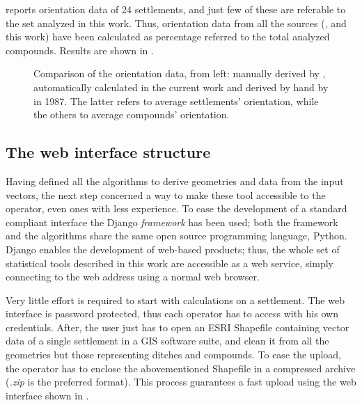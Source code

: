             \cite{jones-tavoliere} reports orientation data of 24 settlements, and just few of these are referable to the set analyzed in this work. Thus, orientation data from all the sources (\cite{laterza}, \cite{jones-tavoliere} and this work) have been calculated as percentage referred to the total analyzed compounds. Results are shown in .

            \begin{figure}[H]
                \centering
                \begin{tikzpicture}
                    
                \end{tikzpicture}
                \caption[Comparison of automatically derived orientation data with the other sources.]{Comparison of the orientation data, from left: manually derived by \citeauthor{laterza}, automatically calculated in the current work and derived by hand by \citeauthor{jones-tavoliere} in 1987. The latter refers to average settlements' orientation, while the others to average compounds' orientation.}
                \label{fig:graph-orient-jones}
            \end{figure}

        \subsection{The web interface structure\label{sec:webgis}}
            Having defined all the algorithms to derive geometries and data from the input vectors, the next step concerned a way to make these tool accessible to the operator, even ones with less experience. To ease the development of a standard compliant interface the Django \emph{framework} has been used; both the framework and the algorithms share the same open source programming language, Python.
            Django enables the development of web-based products; thus, the whole set of statistical tools described in this work are accessible as a web service, simply connecting to the web address using a normal web browser.

            Very little effort is required to start with calculations on a settlement. The web interface is password protected, thus each operator has to access with his own credentials. After, the user just has to open an ESRI Shapefile containing vector data of a single settlement in a GIS software suite, and clean it from all the geometries but those representing ditches and compounds. To ease the upload, the operator has to enclose the abovementioned Shapefile in a compressed archive (\emph{.zip} is the preferred format). This process guarantees a fast upload using the web interface shown in .
            
